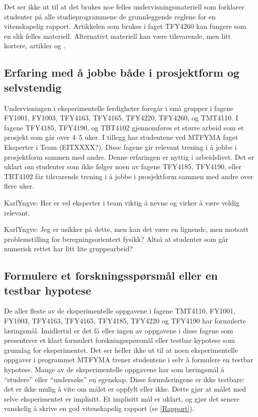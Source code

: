 \documentclass{article}
\begin{document}
Det ser ikke ut til at det brukes noe felles undervisningsmateriell som forklarer studenter på alle studieprogrammene de grunnleggende reglene for en vitenskapelig rapport. Artikkelen som brukes i faget TFY4260 kan fungere som en slik felles materiell. Alternativt materiell kan være tilsvarende, men litt kortere, artikler \cite{Lapin1994} og \cite{Senturia2003}.

\subsection{Erfaring med å jobbe både i prosjektform og selvstendig}
Undervisningen i eksperimentelle ferdigheter foregår i små grupper i fagene FY1001, FY1003, TFY4163, TFY4165, TFY4220, TFY4260, og TMT4110. I fagene TFY4185, TFY4190, og TBT4102 gjennomføres et større arbeid som et prosjekt som går over 4--5 uker. I tillegg har studentene ved MTFYMA faget Eksperter i Team (EITXXXX?). Disse fagene gir relevant trening i å jobbe i prosjektform sammen med andre. Denne erfaringen er nyttig i arbeidslivet.
Det er uklart om studenter som ikke følger noen av fagene TFY4185, TFY4190, eller TBT4102 får tilsvarende trening i å jobbe i prosjektform sammen med andre over flere uker.

{\color{red} KarlYngve: Her er vel eksperter i team viktig å nevne og virker å være veldig relevant.}

{\color{red} KarlYngve: Jeg er usikker på dette, men kan det være en lignende, men motsatt problemstilling for beregningsorientert fysikk? Altså at studenter som går numerisk rettet har litt lite gruppearbeid?}

\subsection{Formulere et forskningsspørsmål eller en testbar hypotese}
De aller fleste av de eksperimentelle oppgavene i fagene TMT4110, FY1001, FY1003, TFY4163, TFY4165, TFY4185, TFY4220 og TFY4190 har formulerte læringsmål. Imidlertid er det få eller ingen av oppgavene i disse fagene som presenterer et klart formulert forskningsspørsmål eller testbar hypotese som grunnlag for eksperimentet. Det ser heller ikke ut til at noen eksperimentelle oppgaver i programmet MTFYMA trener studentene i selv å formulere en testbar hypotese.
Mange av de eksperimentelle oppgavene har som læringsmål å ``studere'' eller ``undersøke'' en egenskap. Disse formuleringene er ikke testbare: det er ikke mulig å vite om målet er oppfylt eller ikke. Dette gjør at målet med selve eksperimentet er implisitt. Et implisitt mål er uklart, og gjør det senere vanskelig å skrive en god vitenskapelig rapport (se \cref{Rapport}).
\end{document}

